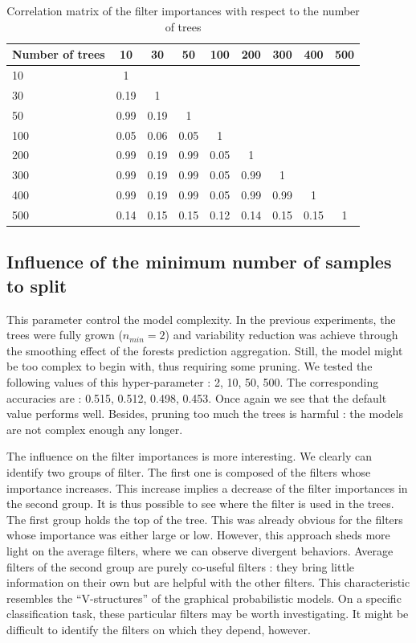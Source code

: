 \documentclass[a4paper]{report}
\newlength{\larg}
\begin{document}
		\begin{table}
			\centering
				\begin{tabular}{|l||c|c|c|c|c|c|c|c|}
				\hline
				Number of trees & 10 & 30 & 50 & 100 & 200 & 300 & 400 & 500 \\
				\hline \hline
				10 & 1 & & & & & & &\\
				\hline
				30 & 0.19 & 1 & & & & & &\\
				\hline
				50 & 0.99 & 0.19 & 1 & & & & & \\
				\hline
				100 & 0.05 & 0.06 & 0.05 & 1 & & & & \\
				\hline
				200 & 0.99 & 0.19 & 0.99 & 0.05 & 1 & & & \\
				\hline
				300 & 0.99 & 0.19 & 0.99 & 0.05 & 0.99 & 1 & & \\
				\hline
				400 & 0.99 & 0.19 & 0.99 & 0.05 & 0.99 & 0.99 & 1 & \\
				\hline
				500 & 0.14 & 0.15 & 0.15 & 0.12 & 0.14 & 0.15 & 0.15 & 1\\
				\hline
				\end{tabular}
			\caption{\label{tab:CorrMatFiltNbTrees}Correlation matrix of the filter importances with respect to the number of trees}
		\end{table}
		
		\subsection{Influence of the minimum number of samples to split}
		This parameter control the model complexity. In the previous experiments, the trees were fully grown ($n_{min} = 2$) and variability reduction was achieve through the smoothing effect of the forests prediction aggregation. Still, the model might be too complex to begin with, thus requiring some pruning. We tested the following values of this hyper-parameter : 2, 10, 50, 500. The corresponding accuracies are : 0.515, 0.512, 0.498, 0.453. Once again we see that the default value performs well. Besides, pruning too much the trees is harmful : the models are not complex enough any longer.
		\par
		The influence on the filter importances is more interesting. We clearly can identify two groups of filter. The first one is composed of the filters whose importance increases. This increase implies a decrease of the filter importances in the second group. It is thus possible to see where the filter is used in the trees. The first group holds the top of the tree. This was already obvious for the filters whose importance was either large or low. However, this approach sheds more light on the average filters, where we can observe divergent behaviors. Average filters of the second group are purely co-useful filters : they bring little information on their own but are helpful with the other filters. This characteristic resembles the ``V-structures'' of the graphical probabilistic models. On a specific classification task, these particular filters may be worth investigating. It might be difficult to identify the filters on which they depend, however.
		
\end{document}
